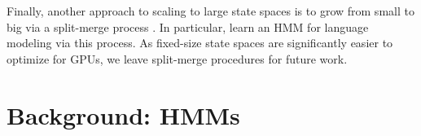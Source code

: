 \documentclass[11pt,a4paper]{article}
\begin{document}
Finally, another approach to scaling to large state spaces is to
grow from small to big via a split-merge process
\citep{petrov2006splitmerge,huang2011thesis}.
In particular, \citet{huang2011thesis} learn an HMM for language modeling
via this process.
As fixed-size state spaces are significantly easier to optimize for 
GPUs, we leave split-merge procedures for future work. 

\section{Background: HMMs}
\end{document}
